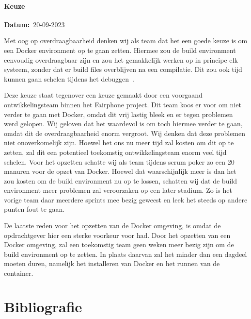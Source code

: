 \documentclass[a4paper]{report}
\newcommand{\timestamp}[1]{
  \mbox{\scriptsize \textbf{Datum:} #1} \smallbreak
}
\begin{document}
\subsubsection{Keuze}
\timestamp{20-09-2023}
Met oog op overdraagbaarheid denken wij als team dat het een goede keuze is om een Docker environment op te gaan zetten. 
Hiermee zou de build environment eenvoudig overdraagbaar zijn en zou het gemakkelijk werken op in principe elk systeem, zonder dat er build files overblijven na een compilatie.
Dit zou ook tijd kunnen gaan schelen tijdens het debuggen~\cite{AffinityBridgeDockerProsCons}. 
\par\smallskip
Deze keuze staat tegenover een keuze gemaakt door een voorgaand ontwikkelingsteam binnen het Fairphone project. 
Dit team koos er voor om niet verder te gaan met Docker, omdat dit vrij lastig bleek en er tegen problemen werd gelopen.
Wij geloven dat het waardevol is om toch hiermee verder te gaan, omdat dit de overdraagbaarheid enorm vergroot. Wij denken dat deze problemen niet onoverkomelijk zijn.
Hoewel het ons nu meer tijd zal kosten om dit op te zetten, zal dit een potentieel toekomstig ontwikkelingsteam enorm veel tijd schelen.
Voor het opzetten schatte wij als team tijdens scrum poker zo een 20 manuren voor de opzet van Docker. Hoewel dat waarschijnlijk meer is dan het zou kosten om de build environment nu op te lossen, schatten wij dat de build environment meer problemen zal veroorzaken op een later stadium. 
Zo is het vorige team daar meerdere sprints mee bezig geweest en leek het steeds op andere punten fout te gaan.

\par\smallskip
De laatste reden voor het opzetten van de Docker omgeving, is omdat de opdrachtgever hier een sterke voorkeur voor had. Door het opzetten van een Docker omgeving, zal een toekomstig team geen weken meer bezig zijn om de build environment op te zetten. In plaats daarvan zal het minder dan een dagdeel moeten duren, namelijk het installeren van Docker en het runnen van de container.

\chapter{Bibliografie}
\begingroup
\renewcommand{\chapter}[2]{} %
\renewcommand{\addcontentsline}[3]{} %


\endgroup

\end{document}
